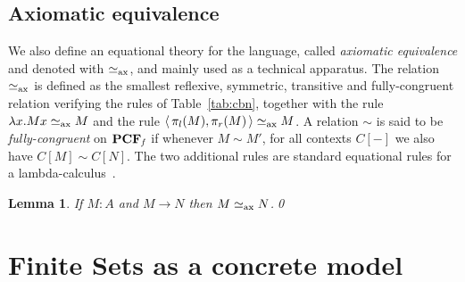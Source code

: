 \documentclass[10pt]{article}
\theoremstyle{plain}
\newtheorem{lemma}[theorem]{Lemma}
\theoremstyle{definition}
\newcommand{\pair}[1]{{\langle\,{#1}\,\rangle}}
\newcommand{\axeq}{\mathrel{\simeq_{\rm ax}}}
\begin{document}
\subsection{Axiomatic equivalence}

We also define an equational theory for the language, called {\em
  axiomatic equivalence} and denoted with $\axeq$, and mainly
used as a technical apparatus.
The relation $\axeq$ is defined as the smallest reflexive, symmetric,
transitive and fully-congruent relation verifying the rules of
Table~\ref{tab:cbn}, together with the rule $\lambda
x.Mx \axeq M$ and the rule $\pair{\pi_l(M),\pi_r(M)} \axeq M$. 
A relation $\sim$ is said to be {\em fully-congruent}
on ${\bf PCF}_{\it f}$ if whenever $M\sim M'$, for all contexts $C[-]$
we also have $C[M]\sim C[N]$. The two additional rules are standard
equational rules for a lambda-calculus~\cite{lambek-scott}.

\begin{lemma}
  \label{lem:opax}
  If $M:A$ and $M\to N$ then $M\axeq N$.\qed
\end{lemma}



\section{Finite Sets as a concrete model}
\label{sec:lc-finset-model}
\label{sec:finset}
\end{document}
